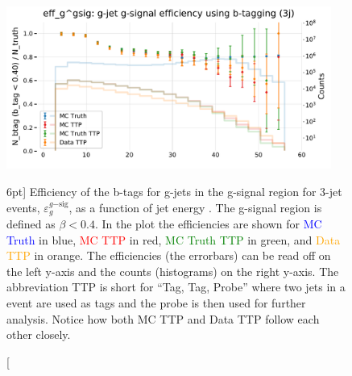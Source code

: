 \documentclass[a4paper, twoside]{tufte-book}
\newcommand{\code}[1]{\colorbox{light-gray}{\texttt{\detokenize{#1}}}}
\newcommand{\q}[1]{``#1''}
\begin{document}
\begin{figure}
  \includegraphics[width=0.95\textwidth, trim=0 0 0 40, clip]{figures/quarks/eff_g_gsig-down_sample=1.00-ML_vars=vertex-selection=b-ejet_min=4-n_iter_RS_lgb=99-n_iter_RS_xgb=9-cdot_cut=0.90-version=19.pdf}
  \caption[b-Tagging Efficiency $\varepsilon_g^{g\mathrm{-sig}}$ as a function of jet energy][6pt]
          {Efficiency of the b-tags for g-jets in the g-signal region for 3-jet events, $\varepsilon_g^{g\mathrm{-sig}}$, as a function of jet energy \code{Ejet}. The g-signal region is defined as $\beta < 0.4$. In the plot the efficiencies are shown for \textcolor{blue}{MC Truth} in blue, \textcolor{red}{MC TTP} in red, \textcolor{green}{MC Truth TTP} in green, and \textcolor{orange}{Data TTP} in orange. The efficiencies (the errorbars) can be read off on the left y-axis and the counts (histograms) on the right y-axis. The abbreviation TTP is short for \q{Tag, Tag, Probe} where two jets in a event are used as tags and the probe is then used for further analysis. Notice how both MC TTP and Data TTP follow each other closely.  
          } 
  \label{fig:q:effiency_btag_gjet_gsig}
\end{figure}
\end{document}
